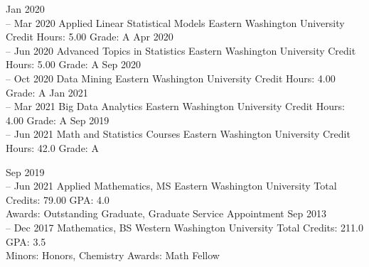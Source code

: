 \documentclass[11pt]{developercv} %
\begin{document}


\begin{entrylist}
	\entry
		{Jan 2020 \\
		-- Mar 2020}
		{Applied Linear Statistical Models}
		{Eastern Washington University}
		{Credit Hours: 5.00 \qquad Grade: A}
	\entry
		{Apr 2020 \\
		-- Jun 2020}
		{Advanced Topics in Statistics}
		{Eastern Washington University}
		{Credit Hours: 5.00 \qquad Grade: A}
	\entry
		{Sep 2020 \\
		-- Oct 2020}
		{Data Mining}
		{Eastern Washington University}
		{Credit Hours: 4.00 \qquad Grade: A}
	\entry
		{Jan 2021 \\
		-- Mar 2021}
		{Big Data Analytics}
		{Eastern Washington University}
		{Credit Hours: 4.00 \qquad Grade: A}
	\entry
		{Sep 2019 \\
		-- Jun 2021}
		{Math and Statistics Courses}
		{Eastern Washington University}
		{Credit Hours: 42.0 \qquad Grade: A}
\end{entrylist}



\begin{entrylist}
	\entry
		{Sep 2019\\
		-- Jun 2021}
		{Applied Mathematics, MS}
		{Eastern Washington University}
		{Total Credits: 79.00 \qquad GPA: 4.0 \\
		Awards: Outstanding Graduate, Graduate Service Appointment
		}
	\entry
		{Sep 2013\\
		-- Dec 2017}
		{Mathematics, BS}
		{Western Washington University}
		{Total Credits: 211.0 \qquad GPA: 3.5 \\
		Minors: Honors, Chemistry
		Awards: Math Fellow
		}
\end{entrylist}
\end{document}
